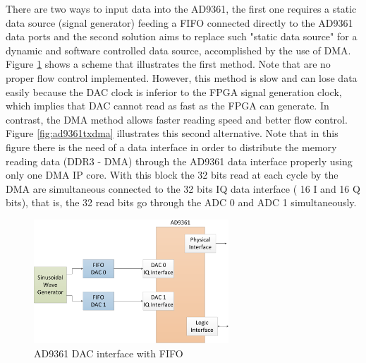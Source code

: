
There are two ways to input data into the AD9361, the first one requires a
static data source (signal generator) feeding a FIFO connected directly to the
AD9361 data ports and the second solution aims to replace such "static data
source" for a dynamic and software controlled data source, accomplished by the
use of DMA. Figure \ref{fig:ad9361txfifo} shows a scheme that illustrates the
first method. Note that are no proper flow control implemented. However, this
method is slow and can lose data easily because the DAC clock is inferior to the
FPGA signal generation clock, which implies that DAC cannot read as fast as the
FPGA can generate. In contrast, the DMA method allows faster reading speed and
better flow control. Figure \ref{fig:ad9361txdma} illustrates this second
alternative. Note that in this figure there is the need of a data interface in
order to distribute the memory reading data (DDR3 - DMA) through the AD9361 data
interface properly using only one DMA IP core. With this block the 32 bits read
at each cycle by the DMA are simultaneous connected to the 32 bits IQ data
interface ( 16 I and 16 Q bits), that is, the 32 read bits go through the ADC 0
and ADC 1 simultaneously.


\begin{figure}[htbp]
    \centering
    \includegraphics[width=0.65\textwidth]{./figures/dac_fifo}
    \caption{ AD9361 DAC interface with FIFO
    \label{fig:ad9361txfifo}}
\end{figure}


